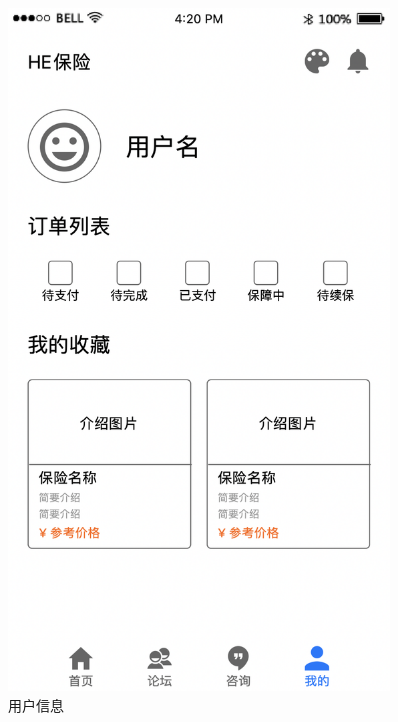 \documentclass[a4paper]{ctexart}
\begin{document}
\begin{figure}[H]
  \centering
  \begin{minipage}[t]{0.3\textwidth}
  \centering
  \includegraphics[width=0.9\textwidth]{prototype4}
  \caption{用户信息}
  \end{minipage}
  \begin{minipage}[t]{0.3\textwidth}
  \centering

\end{minipage}
\end{figure}
\end{document}
